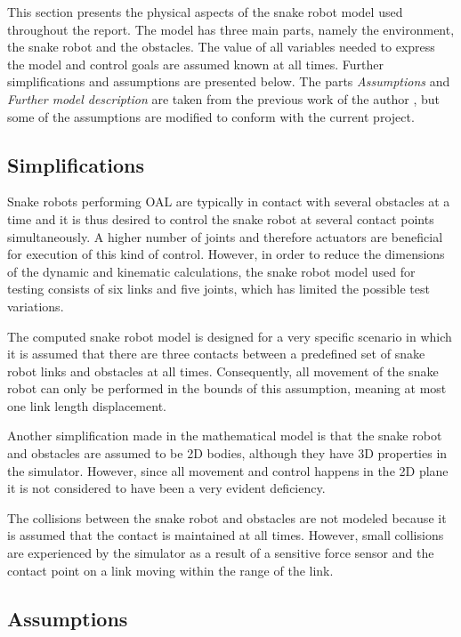 This section presents the physical aspects of the snake robot model used throughout the report. The model has three main parts, namely the environment, the snake robot and the obstacles. The value of all variables needed to express the model and control goals are assumed known at all times. Further simplifications and assumptions are presented below. The parts \textit{Assumptions} and \textit{Further model description} are taken from the previous work of the author \cite{AtussaProsjektoppgp}, but some of the assumptions are modified to conform with the current project.

\subsection{Simplifications}

Snake robots performing OAL are typically in contact with several obstacles at a time and it is thus desired to control the snake robot at several contact points simultaneously. A higher number of joints and therefore actuators are beneficial for execution of this kind of control. However, in order to reduce the dimensions of the dynamic and kinematic calculations, the snake robot model used for testing consists of six links and five joints, which has limited the possible test variations.

The computed snake robot model is designed for a very specific scenario in which it is assumed that there are three contacts between a predefined set of snake robot links and obstacles at all times. Consequently, all movement of the snake robot can only be performed in the bounds of this assumption, meaning at most one link length displacement.

Another simplification made in the mathematical model is that the snake robot and obstacles are assumed to be 2D bodies, although they have 3D properties in the simulator. However, since all movement and control happens in the 2D plane it is not considered to have been a very evident deficiency.

The collisions between the snake robot and obstacles are not modeled because it is assumed that the contact is maintained at all times. However, small collisions are experienced by the simulator as a result of a sensitive force sensor and the contact point on a link moving within the range of the link.


\subsection{Assumptions}\label{seq:assumptions}

